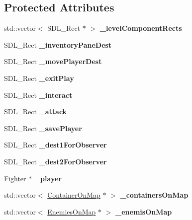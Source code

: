 \subsection*{Protected Attributes}
\begin{DoxyCompactItemize}
\item 
\hypertarget{class_pre_built_level_a0ad1ddb709d1134c31749bdedda1ec4a}{}\label{class_pre_built_level_a0ad1ddb709d1134c31749bdedda1ec4a} 
std\+::vector$<$ S\+D\+L\+\_\+\+Rect $\ast$ $>$ {\bfseries \+\_\+level\+Component\+Rects}
\item 
\hypertarget{class_pre_built_level_ad20d575f1727d070b27b3baf7a0c4706}{}\label{class_pre_built_level_ad20d575f1727d070b27b3baf7a0c4706} 
S\+D\+L\+\_\+\+Rect {\bfseries \+\_\+inventory\+Pane\+Dest}
\item 
\hypertarget{class_pre_built_level_a812edb421a0f77672e772a7a6e4e0a09}{}\label{class_pre_built_level_a812edb421a0f77672e772a7a6e4e0a09} 
S\+D\+L\+\_\+\+Rect {\bfseries \+\_\+move\+Player\+Dest}
\item 
\hypertarget{class_pre_built_level_a0cbf9d08b7fcba3c500092b71baabdbb}{}\label{class_pre_built_level_a0cbf9d08b7fcba3c500092b71baabdbb} 
S\+D\+L\+\_\+\+Rect {\bfseries \+\_\+exit\+Play}
\item 
\hypertarget{class_pre_built_level_a58bfd4f0b1261029643f832486046ee0}{}\label{class_pre_built_level_a58bfd4f0b1261029643f832486046ee0} 
S\+D\+L\+\_\+\+Rect {\bfseries \+\_\+interact}
\item 
\hypertarget{class_pre_built_level_ab10520b34623c3f2bad2376091a85ebd}{}\label{class_pre_built_level_ab10520b34623c3f2bad2376091a85ebd} 
S\+D\+L\+\_\+\+Rect {\bfseries \+\_\+attack}
\item 
\hypertarget{class_pre_built_level_ac548cf0eb963c29aedf7d930a9828e2f}{}\label{class_pre_built_level_ac548cf0eb963c29aedf7d930a9828e2f} 
S\+D\+L\+\_\+\+Rect {\bfseries \+\_\+save\+Player}
\item 
\hypertarget{class_pre_built_level_abd2b8176d4c4d1de51c58d3352492416}{}\label{class_pre_built_level_abd2b8176d4c4d1de51c58d3352492416} 
S\+D\+L\+\_\+\+Rect {\bfseries \+\_\+dest1\+For\+Observer}
\item 
\hypertarget{class_pre_built_level_a4ab513978b0fdbacc89d53a1be7b1d20}{}\label{class_pre_built_level_a4ab513978b0fdbacc89d53a1be7b1d20} 
S\+D\+L\+\_\+\+Rect {\bfseries \+\_\+dest2\+For\+Observer}
\item 
\hypertarget{class_pre_built_level_a2b17bc23df363f269fedf0aceafc9a02}{}\label{class_pre_built_level_a2b17bc23df363f269fedf0aceafc9a02} 
\hyperlink{class_fighter}{Fighter} $\ast$ {\bfseries \+\_\+player}
\item 
\hypertarget{class_pre_built_level_a757b4089f043d4cef9c24a19b24811fe}{}\label{class_pre_built_level_a757b4089f043d4cef9c24a19b24811fe} 
std\+::vector$<$ \hyperlink{struct_container_on_map}{Container\+On\+Map} $\ast$ $>$ {\bfseries \+\_\+containers\+On\+Map}
\item 
\hypertarget{class_pre_built_level_ae816d9cfc76becdd0f24fe281a909884}{}\label{class_pre_built_level_ae816d9cfc76becdd0f24fe281a909884} 
std\+::vector$<$ \hyperlink{struct_enemies_on_map}{Enemies\+On\+Map} $\ast$ $>$ {\bfseries \+\_\+enemis\+On\+Map}
\end{DoxyCompactItemize}
